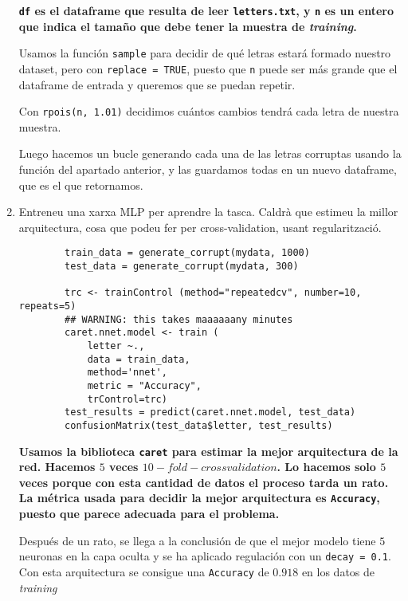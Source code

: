\documentclass[a4paper]{article}
\begin{document}
\begin{enumerate}
        {\bfseries
            \texttt{df} es el dataframe que resulta de leer \texttt{letters.txt}, y \texttt{n} es un entero que indica el tamaño que debe tener la muestra de \textit{training}.

            Usamos la función \texttt{sample} para decidir de qué letras estará formado nuestro dataset, pero con \texttt{replace = TRUE}, puesto que \texttt{n} puede ser más grande que el dataframe de entrada y queremos que se puedan repetir.

            Con \texttt{rpois(n, 1.01)} decidimos cuántos cambios tendrá cada letra de nuestra muestra.

            Luego hacemos un bucle generando cada una de las letras corruptas usando la función del apartado anterior, y las guardamos todas en un nuevo dataframe, que es el que retornamos.
        }

        \item Entreneu una xarxa MLP per aprendre la tasca. Caldrà que estimeu la millor arquitectura, cosa
        que podeu fer per cross-validation, usant regularització.
        \begin{lstlisting}
        train_data = generate_corrupt(mydata, 1000)
        test_data = generate_corrupt(mydata, 300)

        trc <- trainControl (method="repeatedcv", number=10, repeats=5)
        ## WARNING: this takes maaaaaany minutes
        caret.nnet.model <- train (
            letter ~.,
            data = train_data,
            method='nnet',
            metric = "Accuracy",
            trControl=trc)
        test_results = predict(caret.nnet.model, test_data)
        confusionMatrix(test_data$letter, test_results)
        \end{lstlisting}

        {\bfseries
        Usamos la biblioteca \texttt{caret} para estimar la mejor arquitectura de la red. Hacemos $5$ veces $10-fold-crossvalidation$. Lo hacemos solo $5$ veces porque con esta cantidad de datos el proceso tarda un rato. La métrica usada para decidir la mejor arquitectura es \texttt{Accuracy}, puesto que parece adecuada para el problema.

        Después de un rato, se llega a la conclusión de que el mejor modelo tiene $5$ neuronas en la capa oculta y se ha aplicado regulación con un \texttt{decay = 0.1}. Con esta arquitectura se consigue una \texttt{Accuracy} de $0.918$ en los datos de \textit{training}

        }


\end{enumerate}
\end{document}
